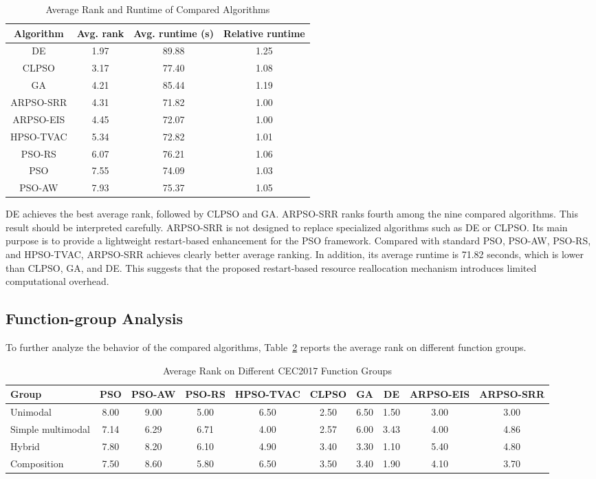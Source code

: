 \documentclass[conference]{IEEEtran}
\begin{document}
\begin{table}[!t]
\caption{Average Rank and Runtime of Compared Algorithms}
\centering
\begin{tabular}{cccc}
\toprule
Algorithm & Avg. rank & Avg. runtime (s) & Relative runtime \\
\midrule
DE & 1.97 & 89.88 & 1.25 \\
CLPSO & 3.17 & 77.40 & 1.08 \\
GA & 4.21 & 85.44 & 1.19 \\
ARPSO-SRR & 4.31 & 71.82 & 1.00 \\
ARPSO-EIS & 4.45 & 72.07 & 1.00 \\
HPSO-TVAC & 5.34 & 72.82 & 1.01 \\
PSO-RS & 6.07 & 76.21 & 1.06 \\
PSO & 7.55 & 74.09 & 1.03 \\
PSO-AW & 7.93 & 75.37 & 1.05 \\
\bottomrule
\end{tabular}
\label{tab:rank_runtime}
\end{table}

DE achieves the best average rank, followed by CLPSO and GA. ARPSO-SRR ranks fourth among the nine compared algorithms. This result should be interpreted carefully. ARPSO-SRR is not designed to replace specialized algorithms such as DE or CLPSO. Its main purpose is to provide a lightweight restart-based enhancement for the PSO framework. Compared with standard PSO, PSO-AW, PSO-RS, and HPSO-TVAC, ARPSO-SRR achieves clearly better average ranking. In addition, its average runtime is 71.82 seconds, which is lower than CLPSO, GA, and DE. This suggests that the proposed restart-based resource reallocation mechanism introduces limited computational overhead.

\subsection{Function-group Analysis}
To further analyze the behavior of the compared algorithms, Table~\ref{tab:group_rank} reports the average rank on different function groups.

\begin{table}[!t]
\caption{Average Rank on Different CEC2017 Function Groups}
\centering
\begin{tabular}{lccccccccc}
\toprule
Group & PSO & PSO-AW & PSO-RS & HPSO-TVAC & CLPSO & GA & DE & ARPSO-EIS & ARPSO-SRR \\
\midrule
Unimodal & 8.00 & 9.00 & 5.00 & 6.50 & 2.50 & 6.50 & 1.50 & 3.00 & 3.00 \\
Simple multimodal & 7.14 & 6.29 & 6.71 & 4.00 & 2.57 & 6.00 & 3.43 & 4.00 & 4.86 \\
Hybrid & 7.80 & 8.20 & 6.10 & 4.90 & 3.40 & 3.30 & 1.10 & 5.40 & 4.80 \\
Composition & 7.50 & 8.60 & 5.80 & 6.50 & 3.50 & 3.40 & 1.90 & 4.10 & 3.70 \\
\bottomrule
\end{tabular}
\label{tab:group_rank}
\end{table}
\end{document}
